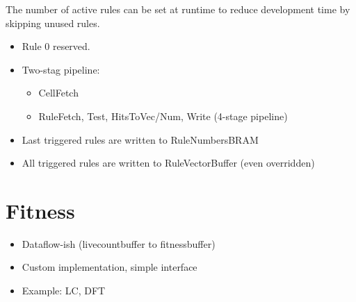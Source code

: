 The number of active rules can be set at runtime to reduce development time by skipping unused rules.
\TODO

\begin{itemize}
    \item Rule 0 reserved.
    \item Two-stag pipeline:
    \begin{itemize}
        \item CellFetch
        \item RuleFetch, Test, HitsToVec/Num, Write (4-stage pipeline)
    \end{itemize}
    \item Last triggered rules are written to RuleNumbersBRAM
    \item All triggered rules are written to RuleVectorBuffer (even overridden)
\end{itemize}

\section{Fitness}

\begin{itemize}
    \item Dataflow-ish (livecountbuffer to fitnessbuffer)
    \item Custom implementation, simple interface
    \item Example: LC, DFT
\end{itemize}


